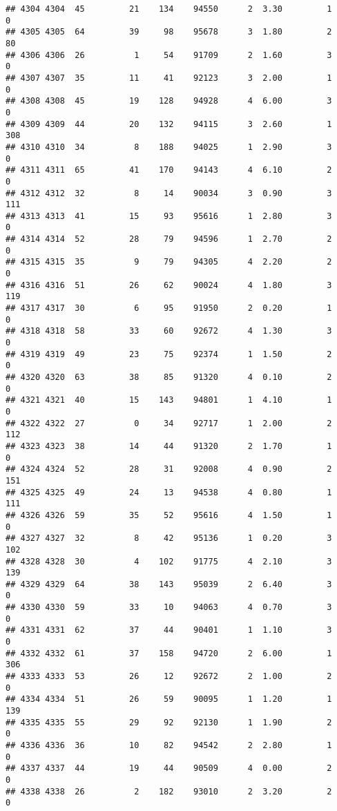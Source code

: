 \documentclass[
]{article}
\begin{document}
\begin{verbatim}
## 4304 4304  45         21    134    94550      2  3.30         1        0
## 4305 4305  64         39     98    95678      3  1.80         2       80
## 4306 4306  26          1     54    91709      2  1.60         3        0
## 4307 4307  35         11     41    92123      3  2.00         1        0
## 4308 4308  45         19    128    94928      4  6.00         3        0
## 4309 4309  44         20    132    94115      3  2.60         1      308
## 4310 4310  34          8    188    94025      1  2.90         3        0
## 4311 4311  65         41    170    94143      4  6.10         2        0
## 4312 4312  32          8     14    90034      3  0.90         3      111
## 4313 4313  41         15     93    95616      1  2.80         3        0
## 4314 4314  52         28     79    94596      1  2.70         2        0
## 4315 4315  35          9     79    94305      4  2.20         2        0
## 4316 4316  51         26     62    90024      4  1.80         3      119
## 4317 4317  30          6     95    91950      2  0.20         1        0
## 4318 4318  58         33     60    92672      4  1.30         3        0
## 4319 4319  49         23     75    92374      1  1.50         2        0
## 4320 4320  63         38     85    91320      4  0.10         2        0
## 4321 4321  40         15    143    94801      1  4.10         1        0
## 4322 4322  27          0     34    92717      1  2.00         2      112
## 4323 4323  38         14     44    91320      2  1.70         1        0
## 4324 4324  52         28     31    92008      4  0.90         2      151
## 4325 4325  49         24     13    94538      4  0.80         1      111
## 4326 4326  59         35     52    95616      4  1.50         1        0
## 4327 4327  32          8     42    95136      1  0.20         3      102
## 4328 4328  30          4    102    91775      4  2.10         3      139
## 4329 4329  64         38    143    95039      2  6.40         3        0
## 4330 4330  59         33     10    94063      4  0.70         3        0
## 4331 4331  62         37     44    90401      1  1.10         3        0
## 4332 4332  61         37    158    94720      2  6.00         1      306
## 4333 4333  53         26     12    92672      2  1.00         2        0
## 4334 4334  51         26     59    90095      1  1.20         1      139
## 4335 4335  55         29     92    92130      1  1.90         2        0
## 4336 4336  36         10     82    94542      2  2.80         1        0
## 4337 4337  44         19     44    90509      4  0.00         2        0
## 4338 4338  26          2    182    93010      2  3.20         2        0

\end{verbatim}
\end{document}
